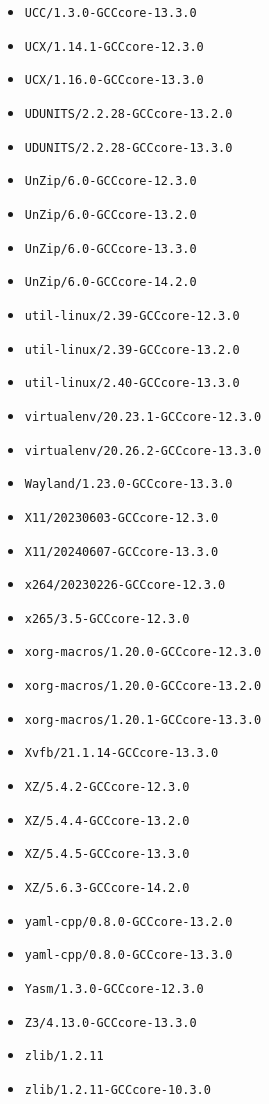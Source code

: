 \begin{multicols}{3}
\begin{itemize}
\item \verb|UCC/1.3.0-GCCcore-13.3.0|
\item \verb|UCX/1.14.1-GCCcore-12.3.0|
\item \verb|UCX/1.16.0-GCCcore-13.3.0|
\item \verb|UDUNITS/2.2.28-GCCcore-13.2.0|
\item \verb|UDUNITS/2.2.28-GCCcore-13.3.0|
\item \verb|UnZip/6.0-GCCcore-12.3.0|
\item \verb|UnZip/6.0-GCCcore-13.2.0|
\item \verb|UnZip/6.0-GCCcore-13.3.0|
\item \verb|UnZip/6.0-GCCcore-14.2.0|
\item \verb|util-linux/2.39-GCCcore-12.3.0|
\item \verb|util-linux/2.39-GCCcore-13.2.0|
\item \verb|util-linux/2.40-GCCcore-13.3.0|
\item \verb|virtualenv/20.23.1-GCCcore-12.3.0|
\item \verb|virtualenv/20.26.2-GCCcore-13.3.0|
\item \verb|Wayland/1.23.0-GCCcore-13.3.0|
\item \verb|X11/20230603-GCCcore-12.3.0|
\item \verb|X11/20240607-GCCcore-13.3.0|
\item \verb|x264/20230226-GCCcore-12.3.0|
\item \verb|x265/3.5-GCCcore-12.3.0|
\item \verb|xorg-macros/1.20.0-GCCcore-12.3.0|
\item \verb|xorg-macros/1.20.0-GCCcore-13.2.0|
\item \verb|xorg-macros/1.20.1-GCCcore-13.3.0|
\item \verb|Xvfb/21.1.14-GCCcore-13.3.0|
\item \verb|XZ/5.4.2-GCCcore-12.3.0|
\item \verb|XZ/5.4.4-GCCcore-13.2.0|
\item \verb|XZ/5.4.5-GCCcore-13.3.0|
\item \verb|XZ/5.6.3-GCCcore-14.2.0|
\item \verb|yaml-cpp/0.8.0-GCCcore-13.2.0|
\item \verb|yaml-cpp/0.8.0-GCCcore-13.3.0|
\item \verb|Yasm/1.3.0-GCCcore-12.3.0|
\item \verb|Z3/4.13.0-GCCcore-13.3.0|
\item \verb|zlib/1.2.11|
\item \verb|zlib/1.2.11-GCCcore-10.3.0|

\end{itemize}
\end{multicols}
